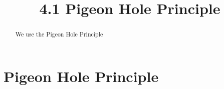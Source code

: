 \documentclass[handout]{ximera}
\title{4.1 Pigeon Hole Principle}
\begin{document}
\begin{abstract}
We use the Pigeon Hole Principle
\end{abstract}

\maketitle

\section{Pigeon Hole Principle}
\end{document}
